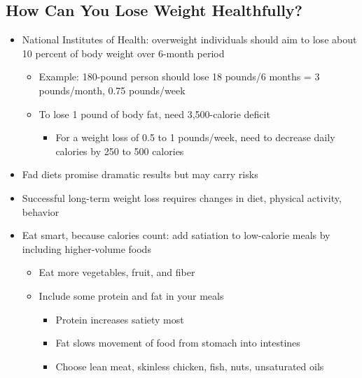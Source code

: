 \documentclass[12pt]{article}
\begin{document}
        \subsection{How Can You Lose Weight Healthfully?}
            \begin{itemize}
                \item National Institutes of Health: overweight individuals should aim to lose about 10 percent of body weight over 6-month period
                    \begin{itemize}
                        \item Example: 180-pound person should lose 18 pounds/6 months = 3 pounds/month, 0.75 pounds/week
                        \item To lose 1 pound of body fat, need 3,500-calorie deficit
                            \begin{itemize}
                                \item For a weight loss of 0.5 to 1 pounds/week, need to decrease daily calories by 250 to 500 calories
                            \end{itemize}
                    \end{itemize}
                \item Fad diets promise dramatic results but may carry risks
                \item Successful long-term weight loss requires changes in diet, physical activity, behavior
                \item Eat smart, because calories count: add satiation to low-calorie meals by including higher-volume foods
                    \begin{itemize}
                        \item Eat more vegetables, fruit, and fiber
                        \item Include some protein and fat in your meals
                            \begin{itemize}
                                \item Protein increases satiety most
                                \item Fat slows movement of food from stomach into intestines
                                \item Choose lean meat, skinless chicken, fish, nuts, unsaturated oils
                            \end{itemize}
                    \end{itemize}

\end{itemize}
\end{document}
